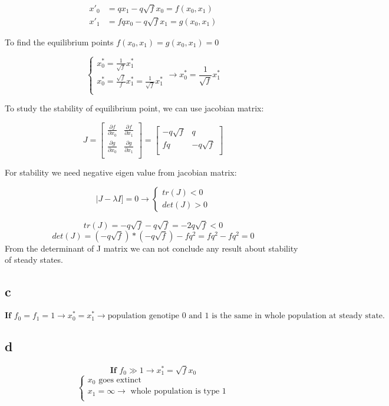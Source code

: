 \begin{align}
x'_0 &= qx_1 - q\sqrt{f}x_0 = f(x_0, x_1 ) \\
x'_1 &= fqx_0 - q\sqrt{f}x_1 = g(x_0, x_1)
\end{align}

To find the equilibrium points $f(x_0, x_1) = g(x_0, x_1) = 0$ 

\[\left\{ \begin{array}{l}
         x^*_0 = \frac{1}{\sqrt{f}}x^*_1\\
         x^*_0 = \frac{\sqrt{f}}{f}x^*_1 = \frac{1}{\sqrt{f}}x^*_1\\
       \end{array} \right. \rightarrow x^*_0 = \frac{1}{\sqrt{f}}x^*_1 \]
       
To study the  stability of equilibrium point, we can use jacobian matrix:

\[ J = \begin{bmatrix}
       \frac{\partial f}{\partial x_0} & \frac{\partial f}{\partial x_1} \\[0.8em]
       \frac{\partial g}{\partial x_0} & \frac{\partial g}{\partial x_1}\\[0.8em]
     \end{bmatrix} = \begin{bmatrix}
            -q\sqrt{f} & q \\[0.3em]
            fq & -q\sqrt{f}\\[0.3em]
          \end{bmatrix} 
\]

For stability we need negative eigen value from jacobian matrix:

\[ |J-\lambda I] = 0 \rightarrow \left\{ \begin{array}{l} tr(J) < 0 \\ det(J) > 0 \end{array} \right. \]

\[ tr(J) = -q\sqrt{f} -q\sqrt{f} = -2q\sqrt{f} < 0 \]
\[ det(J) = (-q\sqrt{f})*(-q\sqrt{f}) -fq^2 = fq^2 -fq^2 = 0 \]
From the determinant of J matrix we can not conclude any result about stability of steady states.

\subsection{c}

\[ \textbf{If } f_0 = f_1 = 1 \rightarrow x^*_0 = x^*_1 \rightarrow \text{population genotipe 0 and 1 is the same in whole population at steady state.}  \]

\subsection{d}

\[ \textbf{If } f_0 \gg 1 \rightarrow x^*_1 = \sqrt{f}x_0 \]
\[ \left\{ \begin{array}{l}
         x_0 \text{ goes extinct}\\
         x_1 = \infty \rightarrow \text{ whole population is type 1}\\
       \end{array} \right. \]
